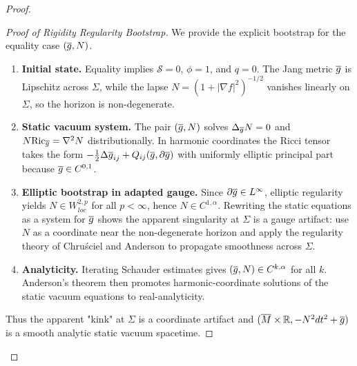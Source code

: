 \begin{proof}
\begin{proof}[Proof of Rigidity Regularity Bootstrap]
We provide the explicit bootstrap for the equality case $(\overline{g}, N)$.
\begin{enumerate}
    \item \textbf{Initial state.} Equality implies $\mathcal{S}=0$, $\phi=1$, and $q=0$. The Jang metric $\overline{g}$ is Lipschitz across $\Sigma$, while the lapse $N=(1+|\nabla f|^2)^{-1/2}$ vanishes linearly on $\Sigma$, so the horizon is non-degenerate.
    \item \textbf{Static vacuum system.} The pair $(\overline{g},N)$ solves $\Delta_{\overline{g}} N = 0$ and $N\mathrm{Ric}_{\overline{g}} = \nabla^2 N$ distributionally. In harmonic coordinates the Ricci tensor takes the form $-\tfrac12 \Delta \overline{g}_{ij} + Q_{ij}(\overline{g},\partial \overline{g})$ with uniformly elliptic principal part because $\overline{g} \in C^{0,1}$.
    \item \textbf{Elliptic bootstrap in adapted gauge.} Since $\partial \overline{g} \in L^\infty$, elliptic regularity yields $N \in W^{2,p}_{loc}$ for all $p<\infty$, hence $N \in C^{1,\alpha}$. Rewriting the static equations as a system for $\overline{g}$ shows the apparent singularity at $\Sigma$ is a gauge artifact: use $N$ as a coordinate near the non-degenerate horizon and apply the regularity theory of Chru\'sciel \cite{chrusciel1990} and Anderson \cite{anderson2000} to propagate smoothness across $\Sigma$.
    \item \textbf{Analyticity.} Iterating Schauder estimates gives $(\overline{g},N) \in C^{k,\alpha}$ for all $k$. Anderson's theorem then promotes harmonic-coordinate solutions of the static vacuum equations to real-analyticity.
\end{enumerate}
Thus the apparent "kink" at $\Sigma$ is a coordinate artifact and $(\overline{M} \times \mathbb{R}, -N^2 dt^2 + \overline{g})$ is a smooth analytic static vacuum spacetime.
\end{proof}


\end{proof}
